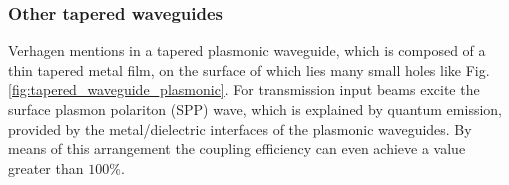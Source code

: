\subsubsection*{Other tapered waveguides}
Verhagen mentions in \cite{tapered_plasmonic_waveguides} a tapered plasmonic waveguide, which is composed of a thin tapered metal film, on the surface of which lies many small holes like Fig. \ref{fig:tapered_waveguide_plasmonic}. For transmission input beams excite the surface plasmon polariton (SPP) wave, which is explained by quantum emission, provided by the metal/dielectric interfaces of the plasmonic waveguides. By means of this arrangement the coupling efficiency can even achieve a value greater than $100\%$.\\

